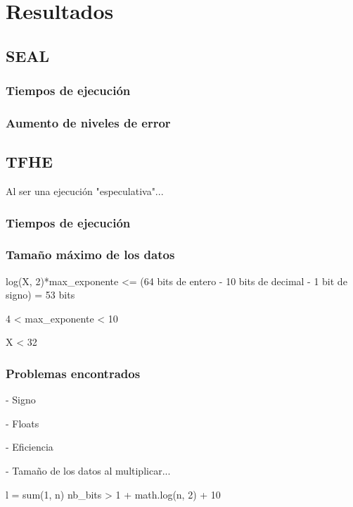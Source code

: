 \chapter{Resultados}
\label{chap:resultados}

\section{SEAL}

\subsection{Tiempos de ejecución}

\subsection{Aumento de niveles de error}

\section{TFHE}

Al ser una ejecución "especulativa"...

\subsection{Tiempos de ejecución}

\subsection{Tamaño máximo de los datos}

log(X, 2)*max_exponente <= (64 bits de entero - 10 bits de decimal - 1 bit de signo) = 53 bits

4 < max_exponente < 10

X < 32

\subsection{Problemas encontrados}

- Signo

- Floats

- Eficiencia


- Tamaño de los datos al multiplicar...

l = sum(1, n)
nb_bits > 1 + math.log(n, 2) + 10